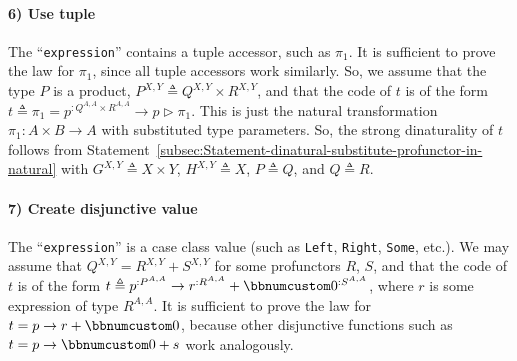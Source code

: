 \paragraph{6) Use tuple }

The \textsf{``}\lstinline!expression!\textsf{''} contains a tuple accessor, such
as $\pi_{1}$. It is sufficient to prove the law for $\pi_{1}$, since
all tuple accessors work similarly. So, we assume that the type $P$
is a product, $P^{X,Y}\triangleq Q^{X,Y}\times R^{X,Y}$, and that
the code of $t$ is of the form $t\triangleq\pi_{1}=p^{:Q^{A,A}\times R^{A,A}}\rightarrow p\triangleright\pi_{1}$.
This is just the natural transformation $\pi_{1}:A\times B\rightarrow A$
with substituted type parameters. So, the strong dinaturality of $t$
follows from Statement~\ref{subsec:Statement-dinatural-substitute-profunctor-in-natural}
with $G^{X,Y}\triangleq X\times Y$, $H^{X,Y}\triangleq X$, $P\triangleq Q$,
and $Q\triangleq R$.

\paragraph{7) Create disjunctive value }

The \textsf{``}\lstinline!expression!\textsf{''} is a case class value (such as \lstinline!Left!,
\lstinline!Right!, \lstinline!Some!, etc.). We may assume that $Q^{X,Y}=R^{X,Y}+S^{X,Y}$
for some profunctors $R$, $S$, and that the code of $t$ is of the
form $t\triangleq p^{:P^{A,A}}\rightarrow r^{:R^{A,A}}+\bbnum 0^{:S^{A,A}}$,
where $r$ is some expression of type $R^{A,A}$. It is sufficient
to prove the law for $t=p\rightarrow r+\bbnum 0$, because other disjunctive
functions such as $t=p\rightarrow\bbnum 0+s$ work analogously.

